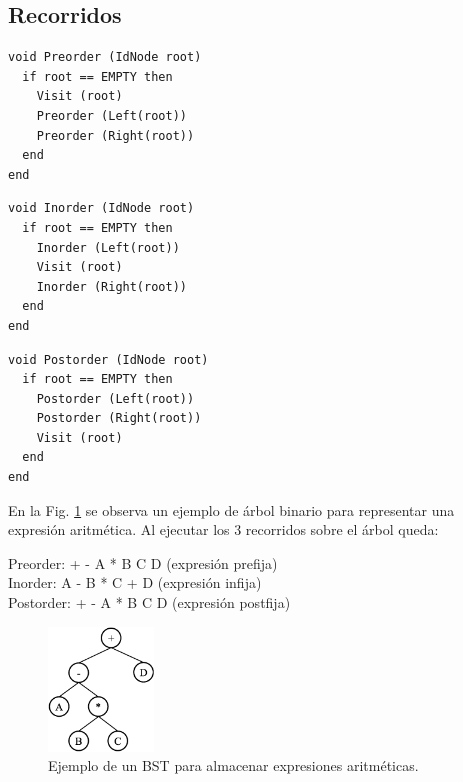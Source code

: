 \subsection{Recorridos}

\begin{lstlisting}[upquote=true, language=pseudo]
void Preorder (IdNode root)
  if root == EMPTY then
    Visit (root)
    Preorder (Left(root))
    Preorder (Right(root))
  end
end
\end{lstlisting}

\begin{lstlisting}[upquote=true, language=pseudo]
void Inorder (IdNode root)
  if root == EMPTY then
    Inorder (Left(root))
    Visit (root)
    Inorder (Right(root))
  end
end
\end{lstlisting}


\begin{lstlisting}[upquote=true, language=pseudo]
void Postorder (IdNode root)
  if root == EMPTY then
    Postorder (Left(root))
    Postorder (Right(root))
    Visit (root)
  end
end
\end{lstlisting}

En la Fig. \ref{fig:bintreeExpresion} se observa un ejemplo de árbol binario para representar una expresión aritmética. Al ejecutar los 3 recorridos sobre el árbol queda:

Preorder: + - A * B C D (expresión prefija) \\
Inorder: A - B * C + D (expresión infija) \\
Postorder: + - A * B C D (expresión postfija) \\

\begin{figure}[htpb!]
  \begin{center}
    \includegraphics[width=0.25\textwidth]{images/bintreeExpresion.eps}
  \end{center}
  \caption{Ejemplo de un BST para almacenar expresiones aritméticas.}
  \label{fig:bintreeExpresion}
\end{figure}



